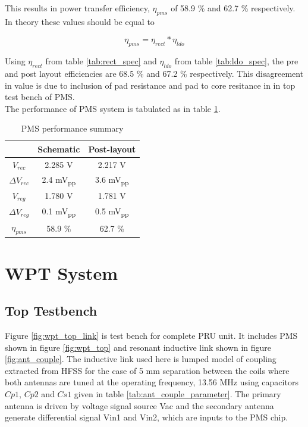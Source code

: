 \documentclass[12pt,a4paper,UKenglish]{report}
\begin{document}
This results in power transfer efficiency, $\eta_{pms}$ of 58.9  \% and 62.7  \% respectively. In 
theory these values should be equal to 

\begin{equation} \label{eq:wpt_effi} 
\eta_{pms} = \eta_{rect}*\eta_{ldo}
\end{equation}

Using $\eta_{rect}$ from table \ref{tab:rect_spec} and $\eta_{ldo}$ from table \ref{tab:ldo_spec}, the pre and post 
layout efficiencies are 68.5  \% and 67.2  \% respectively. This disagreement in value is due to inclusion of pad 
resistance and pad to  core resitance in in top test bench of PMS.\\

The performance of PMS system is tabulated as in table \ref{tab:pms_spec}.
\begin{table}[H]
\caption{PMS performance summary} 
\begin{center}
\begin{tabular}{c|c|c}
\hline \hline
			& \textbf{Schematic}	& \textbf{Post-layout} 	\\
\hline \hline
$V_{rec}$ 			& 2.285 \si{\volt}		& 2.217 V	\\ \hline
$\Delta V_{rec}$	& 2.4 \si{\milli\volt}\textsubscript{pp} & 3.6 \si{\milli\volt}\textsubscript{pp}		\\ \hline
$V_{reg}$			& 1.780	\si{\volt}		& 1.781 \si{\volt}			\\ \hline
$\Delta V_{reg}$ 	& 0.1 \si{\milli\volt}\textsubscript{pp} & 0.5 \si{\milli\volt}\textsubscript{pp}		\\ \hline
$\eta_{pms}$		& 	58.9  \%	& 62.7  \%		\\ 
 
\hline \hline
\end{tabular}
\end{center}
\label{tab:pms_spec}
\end{table}%

\section{WPT System} 
\subsection{Top Testbench} %

Figure \ref{fig:wpt_top_link} is test bench for complete PRU unit. It includes PMS shown in figure \ref{fig:wpt_top} and resonant inductive link shown in figure \ref{fig:ant_couple}. The inductive link used here is lumped model of coupling extracted from HFSS for the case of 5 mm separation between the coils where both antennas are tuned at the operating frequency, 13.56 MHz using capacitors $Cp1$, $Cp2$ and $Cs1$ given in table \ref{tab:ant_couple_parameter}. The primary antenna is driven by voltage signal source Vac and the secondary antenna generate differential signal Vin1 and Vin2, which are inputs to the PMS chip. \\
\end{document}
